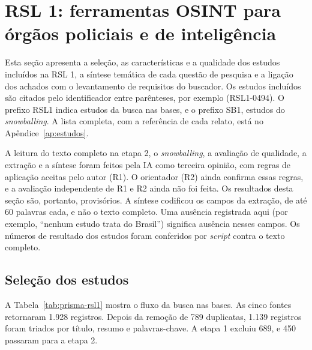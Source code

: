 \section{RSL 1: ferramentas OSINT para órgãos policiais e de inteligência}
\label{sec:resultados-rsl1}

Esta seção apresenta a seleção, as características e a qualidade dos estudos
incluídos na RSL 1, a síntese temática de cada questão de pesquisa e a
ligação dos achados com o levantamento de requisitos do buscador. Os estudos
incluídos são citados pelo identificador entre parênteses, por exemplo
(RSL1-0494). O prefixo RSL1 indica estudos da busca nas bases, e o prefixo
SB1, estudos do \textit{snowballing}. A lista completa, com a referência de
cada relato, está no Apêndice~\ref{ap:estudos}.

A leitura do texto completo na etapa 2, o \textit{snowballing}, a avaliação
de qualidade, a extração e a síntese foram feitos pela IA como terceira
opinião, com regras de aplicação aceitas pelo autor (R1). O orientador (R2)
ainda confirma essas regras, e a avaliação independente de R1 e R2 ainda não
foi feita. Os resultados desta seção são, portanto, provisórios. A síntese
codificou os campos da extração, de até 60 palavras cada, e não o texto
completo. Uma ausência registrada aqui (por exemplo, ``nenhum estudo trata do
Brasil'') significa ausência nesses campos. Os números de resultado dos
estudos foram conferidos por \textit{script} contra o texto completo.

\subsection{Seleção dos estudos}
\label{sec:rsl1-selecao}

A Tabela~\ref{tab:prisma-rsl1} mostra o fluxo da busca nas bases. As cinco
fontes retornaram 1.928 registros. Depois da remoção de 789 duplicatas,
1.139 registros foram triados por título, resumo e palavras-chave. A etapa 1
excluiu 689, e 450 passaram para a etapa 2.

